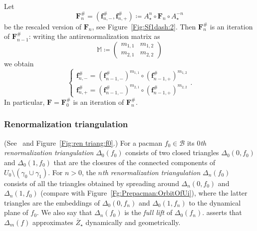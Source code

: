 \documentclass{amsart}
\newcommand{\1}{{\mathbb 1 }}
\newcommand\M{\mathbb M}
\newcommand{\bDelta}{{\mathbb{\Delta}}}
\newcommand{\bF}{{\mathbf F}}
\newcommand{\bbf}{{\mathbf f}}
\newcommand{\str}{{\star}}
\newcommand\BB{\mathcal{B}}
\theoremstyle{remark}
\numberwithin{equation}{section}
\theoremstyle{definition}
\theoremstyle{nonumberbreak}
\begin{document}
 Let 
\[ \bF^{\#}_n=\left(\bbf_{n,-}^\#, \bbf_{n,+}^\# \right)\coloneqq A_\str^{n}\circ \bF_n\circ A_\str^{-n}\]
be the rescaled version of $\bF_n$, see Figure~\ref{Fig:Sf1dash:2}. Then $\bF^{\#}_{n}$ is an iteration of $\bF^{\#}_{n-1}$: writing the antirenormalization matrix as
\begin{equation}
\label{eq:def:M}
\M\coloneqq \left(\begin{matrix}
         m_{1,1} &m_{1,2} \\ m_{2,1} &m_{2,2}
        \end{matrix}\right)
\end{equation}
we obtain 
\begin{equation}
\label{eq:iter of max prep}
\left\{\begin{array}{c}
\bbf^\#_{n,-}=\left( \bbf^\#_{n-1,-}\right)^{m_{1,1}}\circ \left( \bbf^\#_{n-1,+}\right)^{m_{1,2}}\\
\bbf^\#_{n,+}=\left( \bbf^\#_{n-1,-}\right)^{m_{2,1}}\circ \left( \bbf^\#_{n-1,+}\right)^{m_{2,2}}
\end{array}\right..
\end{equation}
In particular, $\bF=\bF_0^\#$ is an iteration of $\bF_n^\#$.






\subsubsection{Renormalization triangulation}
\label{sss:ren trian:pacmen}
(See~\cite[\S4.1]{DLS} and Figure~\ref{Fig:ren triang:f0}.)
For a pacman $f_0\in \BB$ its \emph{$0$th renormalization triangulation} $\bDelta_0(f_0)$ consists of two closed triangles $\Delta_0(0,f_0)$ and $\Delta_0(1,f_0)$ that are the closures of the connected components of $U_0\setminus (\gamma_0\cup \gamma_1)$. For $n> 0$, the \emph{$n$th renormalization triangulation} $\bDelta_n(f_0)$ consists of all the triangles obtained by spreading around $\Delta_n(0,f_0)$ and $\Delta_n(1,f_0)$ (compare with Figure~\ref{Fg:Prepacman:OrbitOfUi}), where the latter triangles are the embeddings of $\Delta_0(0,f_n)$ and $\Delta_0(1,f_n)$ to the dynamical plane of $f_0$. We also say that $\bDelta_n(f_0)$ is the \emph{full lift} of $\bDelta_0(f_n)$. {\cite[Theorem 4.6]{DLS}} asserts that $ \bDelta_m(f)$ approximates $ \overline Z_\str$ dynamically and geometrically.
\end{document}
